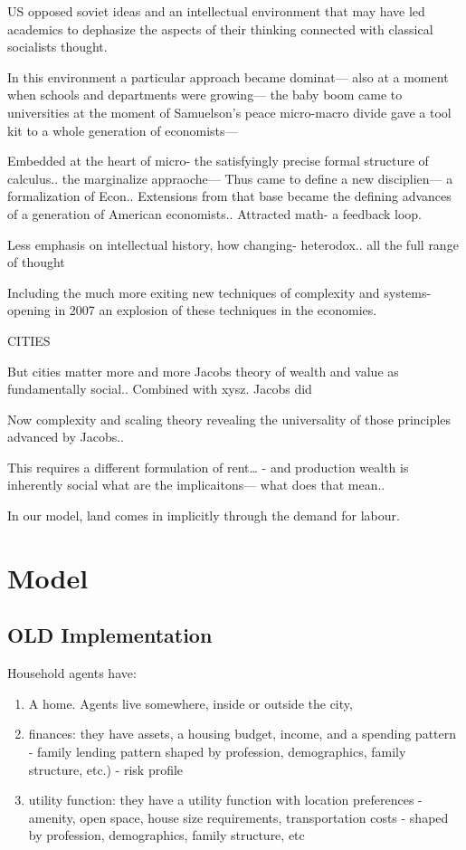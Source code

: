 US opposed soviet ideas and an intellectual environment that may have led academics to dephasize the aspects of their thinking connected with classical socialists thought. 

In this environment a particular approach became dominat--- also at a moment when schools and departments were growing--- the baby boom came to universities at the moment of Samuelson's peace micro-macro divide gave a tool kit to a whole generation of economists--- 

Embedded at the heart of micro- the satisfyingly precise formal structure of calculus.. the marginalize appraoche--- 
Thus came to define a new disciplien--- a formalization of Econ.. 
Extensions from that base became the defining advances of a generation of American economists..
Attracted math- a feedback loop.

Less emphasis on intellectual history, how changing- heterodox.. all the full range of thought

Including the much more exiting new techniques of complexity and systems- opening in 2007 an explosion of these techniques in the economies. 


CITIES

But cities matter more and more
Jacobs theory of wealth and value as fundamentally social.. 
Combined with xysz. Jacobs did

Now complexity and scaling theory revealing the universality of those principles advanced by Jacobs..

This requires a different formulation of rent… - and production wealth is inherently social what are the implicaitons--- what does that mean.. 



In our model, land comes in implicitly through the demand for labour. 



\chapter{Model}



\section{OLD Implementation}


Household agents have:
\begin{enumerate}
   \item A home. Agents live somewhere, inside or outside the city,
   \item finances: they have assets, a housing budget, income, and a spending pattern - family lending pattern  
   shaped by profession, demographics, family structure, etc.) - risk profile
   \item utility function: they have a utility function with location  preferences - amenity, open space, house size requirements, transportation costs - shaped by profession, demographics, family structure, etc
\end{enumerate}	

